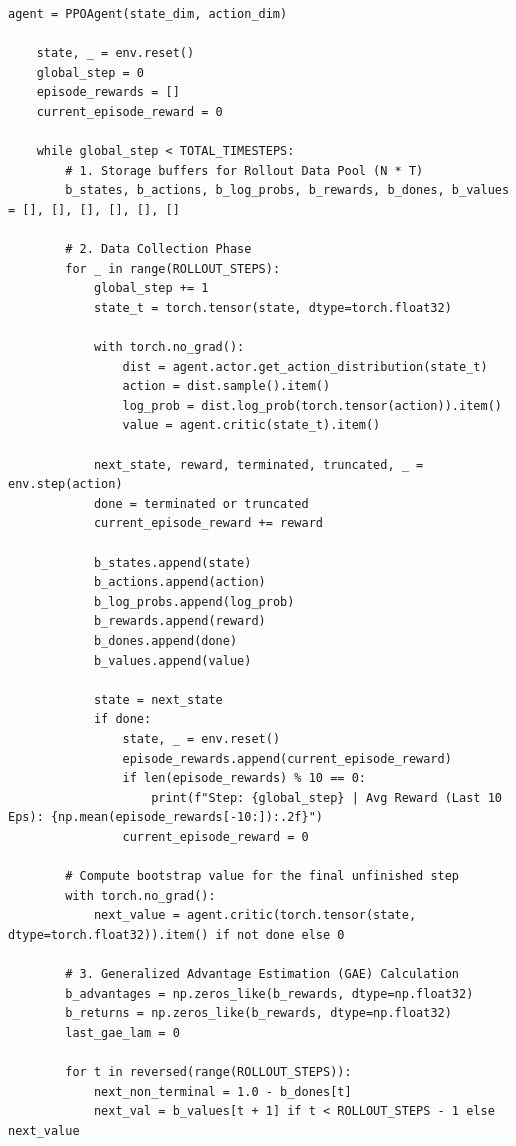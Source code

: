 \documentclass[12pt,a4paper]{article}
\theoremstyle{noteplain}
\theoremstyle{noteexercise}
\begin{document}
\begin{lstlisting}[caption={PPO 算法 PyTorch 实现}, label={lst:ppo}]
    agent = PPOAgent(state_dim, action_dim)
    
    state, _ = env.reset()
    global_step = 0
    episode_rewards = []
    current_episode_reward = 0
    
    while global_step < TOTAL_TIMESTEPS:
        # 1. Storage buffers for Rollout Data Pool (N * T)
        b_states, b_actions, b_log_probs, b_rewards, b_dones, b_values = [], [], [], [], [], []
        
        # 2. Data Collection Phase
        for _ in range(ROLLOUT_STEPS):
            global_step += 1
            state_t = torch.tensor(state, dtype=torch.float32)
            
            with torch.no_grad():
                dist = agent.actor.get_action_distribution(state_t)
                action = dist.sample().item()
                log_prob = dist.log_prob(torch.tensor(action)).item()
                value = agent.critic(state_t).item()
                
            next_state, reward, terminated, truncated, _ = env.step(action)
            done = terminated or truncated
            current_episode_reward += reward
            
            b_states.append(state)
            b_actions.append(action)
            b_log_probs.append(log_prob)
            b_rewards.append(reward)
            b_dones.append(done)
            b_values.append(value)
            
            state = next_state
            if done:
                state, _ = env.reset()
                episode_rewards.append(current_episode_reward)
                if len(episode_rewards) % 10 == 0:
                    print(f"Step: {global_step} | Avg Reward (Last 10 Eps): {np.mean(episode_rewards[-10:]):.2f}")
                current_episode_reward = 0
                
        # Compute bootstrap value for the final unfinished step
        with torch.no_grad():
            next_value = agent.critic(torch.tensor(state, dtype=torch.float32)).item() if not done else 0
            
        # 3. Generalized Advantage Estimation (GAE) Calculation
        b_advantages = np.zeros_like(b_rewards, dtype=np.float32)
        b_returns = np.zeros_like(b_rewards, dtype=np.float32)
        last_gae_lam = 0
        
        for t in reversed(range(ROLLOUT_STEPS)):
            next_non_terminal = 1.0 - b_dones[t]
            next_val = b_values[t + 1] if t < ROLLOUT_STEPS - 1 else next_value
            

\end{lstlisting}
\end{document}

